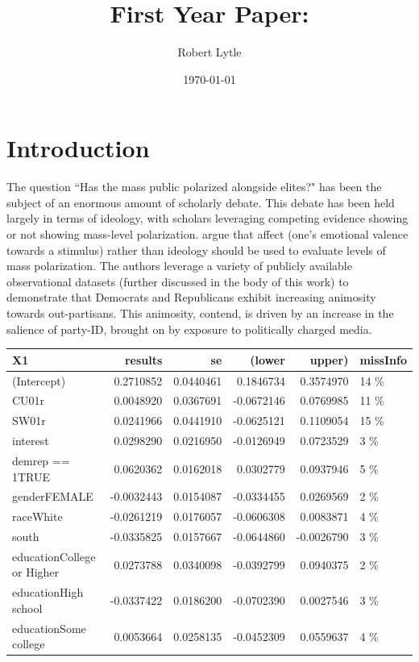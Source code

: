 \documentclass[12pt]{article}
\begin{document}
\title{First Year Paper:\\ \large{\citet{iyengar2012affect}}}
\author{Robert Lytle}
\date{\today}
\maketitle
\thispagestyle{empty}
\clearpage
\section{Introduction}
The question ``Has the mass public polarized alongside elites?" has been the subject of an enormous amount of scholarly debate. This debate has been held largely in terms of ideology, with scholars leveraging competing evidence showing \citep{abramowitz2010disappearing} or not showing \citep{fiorina2012disconnect} mass-level polarization. \cite{iyengar2012affect} argue that affect (one's emotional valence towards a stimulus) rather than ideology should be used to evaluate levels of mass polarization. The authors leverage a variety of publicly available observational datasets
 (further discussed in the body of this work) to demonstrate that Democrats and Republicans exhibit increasing animosity towards out-partisans. This animosity, \cite{iyengar2012affect} contend, is driven by an increase in the salience of party-ID, brought on by exposure to politically charged media.


\begin{tabular}{l|r|r|r|r|l}
\hline
X1 & results & se & (lower & upper) & missInfo\\
\hline
(Intercept) & 0.2710852 & 0.0440461 & 0.1846734 & 0.3574970 & 14 \%\\
\hline
CU01r & 0.0048920 & 0.0367691 & -0.0672146 & 0.0769985 & 11 \%\\
\hline
SW01r & 0.0241966 & 0.0441910 & -0.0625121 & 0.1109054 & 15 \%\\
\hline
interest & 0.0298290 & 0.0216950 & -0.0126949 & 0.0723529 & 3 \%\\
\hline
demrep == 1TRUE & 0.0620362 & 0.0162018 & 0.0302779 & 0.0937946 & 5 \%\\
\hline
genderFEMALE & -0.0032443 & 0.0154087 & -0.0334455 & 0.0269569 & 2 \%\\
\hline
raceWhite & -0.0261219 & 0.0176057 & -0.0606308 & 0.0083871 & 4 \%\\
\hline
south & -0.0335825 & 0.0157667 & -0.0644860 & -0.0026790 & 3 \%\\
\hline
educationCollege or Higher & 0.0273788 & 0.0340098 & -0.0392799 & 0.0940375 & 2 \%\\
\hline
educationHigh school & -0.0337422 & 0.0186200 & -0.0702390 & 0.0027546 & 3 \%\\
\hline
educationSome college & 0.0053664 & 0.0258135 & -0.0452309 & 0.0559637 & 4 \%\\
\hline
\end{tabular}
\end{document}
